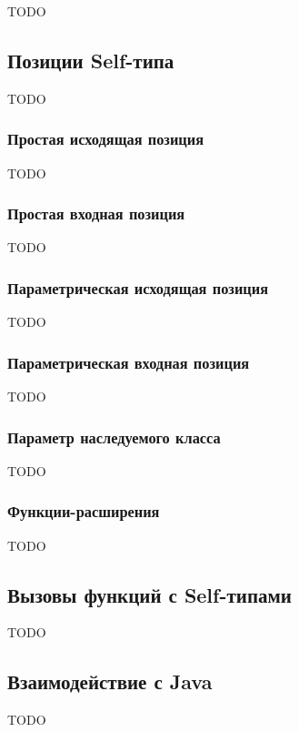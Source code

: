 TODO %

\subsection{Позиции Self-типа}

TODO %

\subsubsection{Простая исходящая позиция}

TODO %

\subsubsection{Простая входная позиция}

TODO %

\subsubsection{Параметрическая исходящая позиция}

TODO %

\subsubsection{Параметрическая входная позиция}

TODO %

\subsubsection{Параметр наследуемого класса}

TODO %

\subsubsection{Функции-расширения}

TODO %

\subsection{Вызовы функций с Self-типами}

TODO %

\subsection{Взаимодействие с Java}

TODO %
